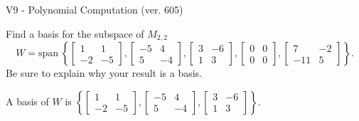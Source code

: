 \begin{exercise}
  \begin{exerciseTitle}V9 - Polynomial Computation (ver. 605)\end{exerciseTitle}
  \begin{exerciseStatement}
    Find a basis for the subspace of \(M_{2,2}\) 
\[W=\mathrm{span}\ \left\{\left[\begin{array}{cc}
1 & 1 \\
-2 & -5
\end{array}\right] , \left[\begin{array}{cc}
-5 & 4 \\
5 & -4
\end{array}\right] , \left[\begin{array}{cc}
3 & -6 \\
1 & 3
\end{array}\right] , \left[\begin{array}{cc}
0 & 0 \\
0 & 0
\end{array}\right] , \left[\begin{array}{cc}
7 & -2 \\
-11 & 5
\end{array}\right]\right\}.\]
 Be sure to explain why your result is a basis.


  \end{exerciseStatement}
  \begin{exerciseAnswer}
   A basis of \(W\) is  \(\left\{\left[\begin{array}{cc}
1 & 1 \\
-2 & -5
\end{array}\right] , \left[\begin{array}{cc}
-5 & 4 \\
5 & -4
\end{array}\right] , \left[\begin{array}{cc}
3 & -6 \\
1 & 3
\end{array}\right]\right\}\).
  


  \end{exerciseAnswer}
\end{exercise}